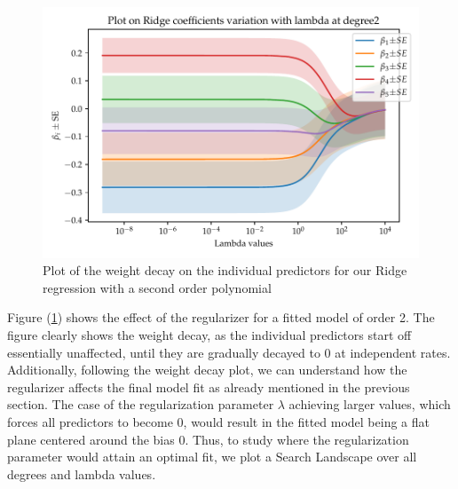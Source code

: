 \documentclass[11pt, a4paper]{article}
\begin{document}
\begin{figure}
  \centering
  \includegraphics[scale=0.75]{figures/EX4_beta_plot_ridge_2.pdf}
  \caption{\label{fig:ridge_decay_beta}Plot of the weight decay on the individual predictors for our Ridge regression with a second order polynomial}
\end{figure}

Figure (\ref{fig:ridge_decay_beta}) shows the effect of the regularizer for a fitted model of order 2. The figure clearly shows the weight decay, as the individual predictors start off essentially unaffected, until they are gradually decayed to 0 at independent rates. Additionally, following the weight decay plot, we can understand how the regularizer affects the final model fit as already mentioned in the previous section. The case of the regularization parameter $\lambda$ achieving larger values, which forces all predictors to become 0, would result in the fitted model being a flat plane centered around the bias 0. Thus, to study where the regularization parameter would attain an optimal fit, we plot a Search Landscape over all degrees and lambda values.
\end{document}
